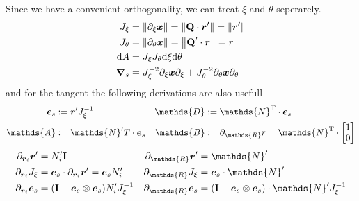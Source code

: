 \documentclass[a4paper,11pt]{article}
\renewcommand{\to}[1]{\text{\boldmath $#1$}} %
\newcommand{\ts}[1]{\text{\boldmath $\mathrm{#1}$}} %
\newcommand{\uv}[1]{\mathds{#1}}
\newcommand{\um}[1]{\mathds{#1}}
\newcommand{\intd}[1]{\mathrm{d}#1}
\newcommand{\pderiv}[2]{\partial_{#2} #1}
\newcommand{\norm}[1]{\left\lVert{#1}\right\rVert}
\newcommand{\T}{\mathrm{T}}
\newcommand{\defeq}{:=}
\begin{document}
Since we have a convenient orthogonality, we can treat $\xi$ and $\theta$ seperarely.
\begin{align}
 J_\xi &= \norm{\pderiv{\to x}{\xi}} = \norm{\ts Q \cdot \to r'} = \norm{\to r'}\\
 J_\theta &= \norm{\pderiv{\to x}{\theta}} = \norm{\ts Q' \cdot \to r} = r \\
 \intd A &= J_\xi J_\theta \intd \xi \intd \theta \\
 \to\nabla_s &= J_\xi^{-2} \pderiv{\to x}{\xi}\pderiv{}{\xi} + J_\theta^{-2} \pderiv{\to x}{\theta}\pderiv{}{\theta}
\end{align}
and for the tangent the following derivations are also usefull
\begin{align}
 \to e_s &\defeq \to r' J_\xi^{-1} & \uv D &\defeq \um N^\T \cdot \to e_s\\
 \uv A &\defeq {\um N}'^\T \cdot \to e_s & \uv B &\defeq \pderiv{r}{\uv R} = {\um N}^\T \cdot \begin{bmatrix}1\\0\end{bmatrix}\\
\end{align}
\begin{align}
 \pderiv{\to r'}{\to r_i} &= N_i' \ts I
	& \pderiv{\to r'}{\uv R} &= \um N'\\
 \pderiv{J_\xi}{\to r_i} &= \to e_s \cdot \pderiv{\to r'}{\to r_i} = \to e_s N_i'
	& \pderiv{J_\xi}{\uv R} &= \to e_s\cdot \um N' \\
 \pderiv{\to e_s}{\to r_i} &= (\ts I - \to e_s\otimes\to e_s)N_i' J_\xi^{-1}
	& \pderiv{\to e_s}{\uv R} &= (\ts I - \to e_s \otimes \to e_s )\cdot \um N' J_\xi^{-1}
\end{align}
\end{document}
